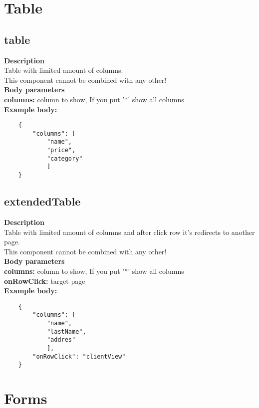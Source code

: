 \documentclass[a4paper, 12pt]{report}
\begin{document}
\section{Table}
\subsection{table}
\textbf{\color{redText} Description} \\
Table with limited amount of columns.\\
{\color{redText} This component cannot be combined with any other!}\\
\textbf{\color{redText} Body parameters} \\
\textbf{columns:} column to show, If you put '*' show all columns\\
\textbf{\color{redText} Example body: }
\begin{lstlisting}
    {
        "columns": [
            "name",
            "price",
            "category" 
            ]
    }
\end{lstlisting}
\subsection{extendedTable}
\textbf{\color{redText} Description} \\
Table with limited amount of columns and after click row it's redirects to another page. \\
{\color{redText} This component cannot be combined with any other!}\\
\textbf{\color{redText} Body parameters} \\
\textbf{columns:} column to show, If you put '*' show all columns\\
\textbf{onRowClick:} target page\\
\textbf{\color{redText} Example body: }
\begin{lstlisting}
    {
        "columns": [
            "name",
            "lastName",
            "addres"
            ],
        "onRowClick": "clientView"
    }
\end{lstlisting}
\section{Forms}
\end{document}
